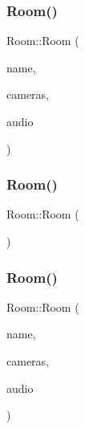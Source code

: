 \subsubsection{\texorpdfstring{Room()}{Room()}\hspace{0.1cm}{\footnotesize\ttfamily [1/4]}}
{\footnotesize\ttfamily Room\+::\+Room (\begin{DoxyParamCaption}\item[{string}]{name,  }\item[{vector$<$ \hyperlink{struct_camera}{Camera} $>$}]{cameras,  }\item[{\hyperlink{struct_audio_source}{Audio\+Source}}]{audio }\end{DoxyParamCaption})\hspace{0.3cm}{\ttfamily [inline]}}

\mbox{\label{class_room_ac6ef93a7d9c3e1d624e025058d5f16ff}} 
\subsubsection{\texorpdfstring{Room()}{Room()}\hspace{0.1cm}{\footnotesize\ttfamily [2/4]}}
{\footnotesize\ttfamily Room\+::\+Room (\begin{DoxyParamCaption}{ }\end{DoxyParamCaption})\hspace{0.3cm}{\ttfamily [inline]}}

\mbox{\label{class_room_a545e0b1d59ba66d72691c0dec993d9f0}} 
\subsubsection{\texorpdfstring{Room()}{Room()}\hspace{0.1cm}{\footnotesize\ttfamily [3/4]}}
{\footnotesize\ttfamily Room\+::\+Room (\begin{DoxyParamCaption}\item[{string}]{name,  }\item[{vector$<$ \hyperlink{struct_camera}{Camera} $>$}]{cameras,  }\item[{\hyperlink{struct_audio_source}{Audio\+Source}}]{audio }\end{DoxyParamCaption})\hspace{0.3cm}{\ttfamily [inline]}}


